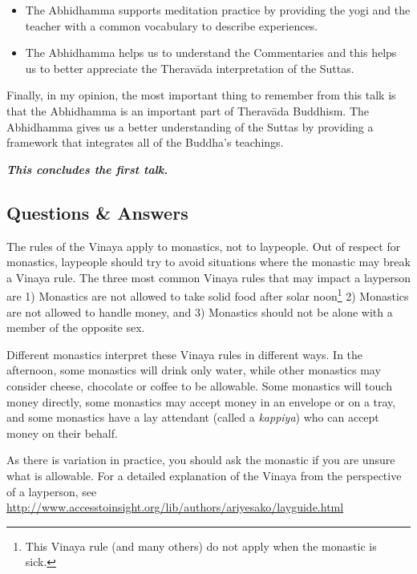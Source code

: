 \begin{itemize}
\item The Abhidhamma supports meditation practice by providing the yogi and the teacher with a common vocabulary to describe experiences.

\item The Abhidhamma helps us to understand the Commentaries and this helps us to better appreciate the Theravāda interpretation of the Suttas.

\end{itemize}

Finally, in my opinion, the most important thing to remember from this talk is that the Abhidhamma is an important part of Theravāda Buddhism. The Abhidhamma gives us a better understanding of the Suttas by providing a framework that integrates all of the Buddha’s teachings.

\begin{center}
\textbf{\textit{This concludes the first talk.}} \\
\end{center}

\newpage

\subsection*{Questions \& Answers}


The rules of the Vinaya apply to monastics, not to laypeople. Out of respect for monastics, laypeople should try to avoid situations where the monastic may break a Vinaya rule. The three most common Vinaya rules that may impact a layperson are 1) Monastics are not allowed to take solid food after solar noon\footnote{This Vinaya rule (and many others) do not apply when the monastic is sick.} 2) Monastics are not allowed to handle money, and 3) Monastics should not be alone with a member of the opposite sex.

Different monastics interpret these Vinaya rules in different ways. In the afternoon, some monastics will drink only water, while other monastics may consider cheese, chocolate or coffee to be allowable. Some monastics will touch money directly, some monastics may accept money in an envelope or on a tray, and some monastics have a lay attendant (called a \textit{kappiya}) who can accept money on their behalf.

As there is variation in practice, you should ask the monastic if you are unsure what is allowable. For a detailed explanation of the Vinaya from the perspective of a layperson, see \url{http://www.accesstoinsight.org/lib/authors/ariyesako/layguide.html}

